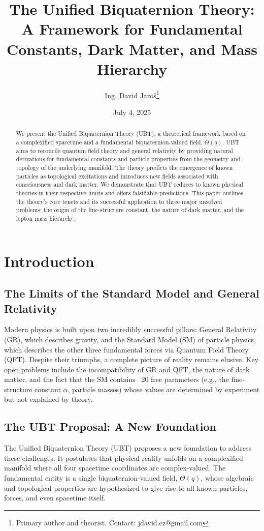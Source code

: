 \documentclass[12pt, a4paper]{article}
\title{\textbf{The Unified Biquaternion Theory: A Framework for Fundamental Constants, Dark Matter, and Mass Hierarchy}}
\author{Ing. David Jaroš\thanks{Primary author and theorist. Contact: jdavid.cz@gmail.com}} \\
\date{July 4, 2025}
\begin{document}
\maketitle


\begin{abstract}
We present the Unified Biquaternion Theory (UBT), a theoretical framework based on a complexified spacetime and a fundamental biquaternion-valued field, \( \Theta(q) \). UBT aims to reconcile quantum field theory and general relativity by providing natural derivations for fundamental constants and particle properties from the geometry and topology of the underlying manifold. The theory predicts the emergence of known particles as topological excitations and introduces new fields associated with consciousness and dark matter. We demonstrate that UBT reduces to known physical theories in their respective limits and offers falsifiable predictions. This paper outlines the theory's core tenets and its successful application to three major unsolved problems: the origin of the fine-structure constant, the nature of dark matter, and the lepton mass hierarchy.
\end{abstract}

\tableofcontents
\newpage

\section{Introduction}

\subsection{The Limits of the Standard Model and General Relativity}
Modern physics is built upon two incredibly successful pillars: General Relativity (GR), which describes gravity, and the Standard Model (SM) of particle physics, which describes the other three fundamental forces via Quantum Field Theory (QFT). Despite their triumphs, a complete picture of reality remains elusive. Key open problems include the incompatibility of GR and QFT, the nature of dark matter, and the fact that the SM contains ~20 free parameters (e.g., the fine-structure constant \(\alpha\), particle masses) whose values are determined by experiment but not explained by theory.

\subsection{The UBT Proposal: A New Foundation}
The Unified Biquaternion Theory (UBT) proposes a new foundation to address these challenges. It postulates that physical reality unfolds on a complexified manifold where all four spacetime coordinates are complex-valued. The fundamental entity is a single biquaternion-valued field, \( \Theta(q) \), whose algebraic and topological properties are hypothesized to give rise to all known particles, forces, and even spacetime itself.
\end{document}
